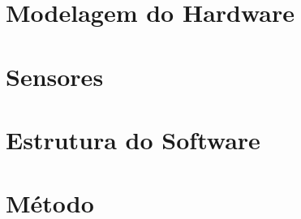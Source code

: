 \documentclass[../../layout.tex]{subfiles}
\begin{document}
\section{Modelagem do Hardware}
\hspace*{3em}\blindtext[1]

\section{Sensores}
\hspace*{3em}\blindtext[1]

\section{Estrutura do Software}
\hspace*{3em}\blindtext[1]

\section{Método}
\hspace*{3em}\blindtext[1]
\end{document}
